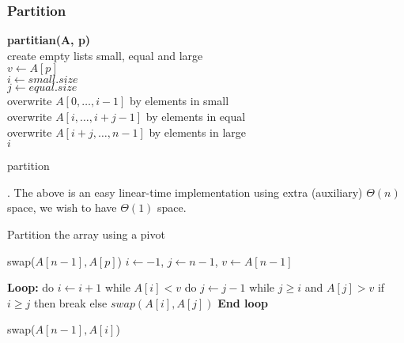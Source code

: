 \documentclass{article}
\begin{document}
\subsubsection{Partition}

\begin{algorithm}[H]
    \SetAlgoLined %
    
    \textbf{partitian(A, p)}\\
    create empty lists small, equal and large \\
    $v \leftarrow A[p]$ \\
    $i \leftarrow small.size$ \\ 
    $j \leftarrow equal.size$ \\ 
    overwrite $A[0,\ldots, i-1]$ by elements in small \\ 
    overwrite $A[i,\ldots, i+j-1]$  by elements in equal \\ 
    overwrite $A[i+j,\ldots,n-1]$ by elements in large \\ 
    \Return $i$\;
    \caption{partition}
\end{algorithm}

\begin{comm}[].
    The above is an easy linear-time implementation using extra (auxiliary) $\Theta(n)$ space, we wish to have $\Theta(1)$ space. 
\end{comm}

\begin{algorithm}[H]
    \DontPrintSemicolon  %
    \caption{Partition the array using a pivot}
    
    swap($A[n-1], A[p]$)
    $i \gets -1$, $j \gets n - 1$, $v \gets A[n-1]$\;
    
    \textbf{Loop:}
    \>\>\>\> do $i \leftarrow i+1$  while $A[i] < v$ \; 
    \>\>\>\> do $j \leftarrow j-1$  while $j \geq i$ and $A[j] > v$ \; 
    \>\>\>\> if $i \geq j$ then break \; 
    \>\>\>\> else $swap(A[i] , A[j])$ \;
    \textbf{End loop}
    
    swap($A[n-1], A[i]$)
    \;
\end{algorithm}
\end{document}
